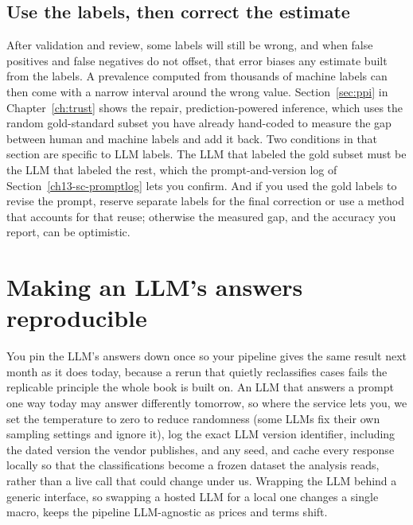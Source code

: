\subsection{Use the labels, then correct the estimate}\label{sec:ch13-ppi}
After validation and review, some labels will still be wrong, and when false positives and false negatives do not offset, that error biases any estimate built from the labels. A prevalence computed from thousands of machine labels can then come with a narrow interval around the wrong value. Section~\ref{sec:ppi} in Chapter~\ref{ch:trust} shows the repair, prediction-powered inference, which uses the random gold-standard subset you have already hand-coded to measure the gap between human and machine labels and add it back. Two conditions in that section are specific to LLM labels. The LLM that labeled the gold subset must be the LLM that labeled the rest, which the prompt-and-version log of Section~\ref{ch13-sc-promptlog} lets you confirm. And if you used the gold labels to revise the prompt, reserve separate labels for the final correction or use a method that accounts for that reuse; otherwise the measured gap, and the accuracy you report, can be optimistic.

\section{Making an LLM's answers reproducible}
You pin the LLM's answers down once so your pipeline gives the same result next month as it does today, because a rerun that quietly reclassifies cases fails the replicable principle the whole book is built on. An LLM that answers a prompt one way today may answer differently tomorrow, so where the service lets you, we set the temperature to zero to reduce randomness (some LLMs fix their own sampling settings and ignore it), log the exact LLM version identifier, including the dated version the vendor publishes, and any seed, and cache every response locally so that the classifications become a frozen dataset the analysis reads, rather than a live call that could change under us. Wrapping the LLM behind a generic interface, so swapping a hosted LLM for a local one changes a single macro, keeps the pipeline LLM-agnostic as prices and terms shift.

